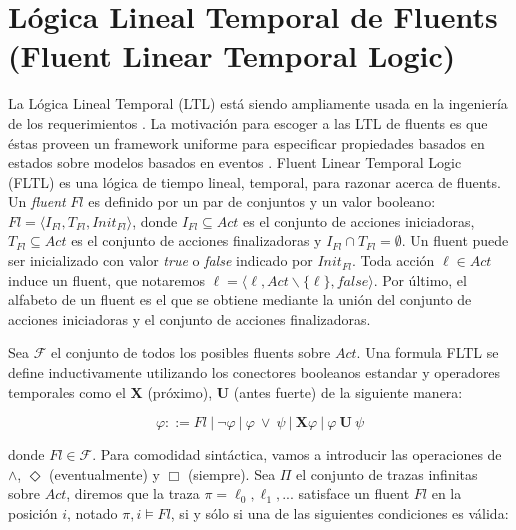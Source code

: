 \section{Lógica Lineal Temporal de Fluents (Fluent Linear Temporal Logic)}
\label{LTL}

La Lógica Lineal Temporal (LTL) está siendo ampliamente usada en la ingeniería de los requerimientos
\cite{1347546,Giannakopoulou:2003:FMC:940071.940106,879820,Letier:2002:ATG:581339.581353}. La motivación para escoger a
las LTL de fluents es que éstas proveen un framework uniforme para especificar propiedades basados en estados sobre
modelos basados en eventos \cite{Giannakopoulou:2003:FMC:940071.940106}. Fluent Linear Temporal Logic (FLTL) \cite{Giannakopoulou:2003:FMC:940071.940106}
es una lógica de tiempo lineal, temporal, para razonar acerca de fluents. Un \emph{fluent} $Fl$ es definido por un par de
conjuntos y un valor booleano: $Fl = \langle I_{Fl},T_{Fl},Init_{Fl}\rangle$, donde $I_{Fl} \subseteq Act$ es el
conjunto de acciones iniciadoras, $T_{Fl} \subseteq Act$ es el conjunto de acciones finalizadoras y $I_{Fl} \cap T_{Fl}
= \emptyset$. Un fluent puede ser inicializado con valor \emph{true} o \emph{false} indicado por $Init_{Fl}$. Toda acción $\ell \in
Act$ induce un fluent, que notaremos $\ell = \langle\ell, Act \backslash \{\ell\}, false\rangle$. Por último, el alfabeto
de un fluent es el que se obtiene mediante la unión del conjunto de acciones iniciadoras y el conjunto de acciones
finalizadoras.

Sea $\mathcal{F}$ el conjunto de todos los posibles fluents sobre $Act$. Una formula FLTL se define inductivamente
utilizando los conectores booleanos estandar y operadores temporales como el $\mathbf{X}$ (próximo), $\mathbf{U}$ (antes
fuerte) de la siguiente manera:

\begin{center}
\begin{equation}
    \varphi ::= Fl\ |\ \neg\varphi\ |\ \varphi\ \lor\ \psi\ |\ \mathbf{X} \varphi\ |\ \varphi\ \mathbf{U}\ \psi
\end{equation}
\end{center}

\noindent donde $Fl \in \mathcal{F}$. Para comodidad sintáctica, vamos a introducir las operaciones de $\land$,
$\Diamond$ (eventualmente) y $\Box$ (siempre). Sea $\Pi$ el conjunto de trazas infinitas sobre $Act$, diremos que la
traza $\pi = \ell_0,\ell_1,...$ satisface un fluent $Fl$ en la posición $i$, notado $\pi,i\vDash Fl$, si y sólo si una de
las siguientes condiciones es válida:

